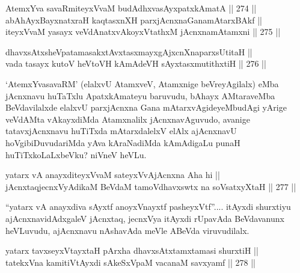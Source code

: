 
\begin{shl}
AtemxYva savaRmiteyxVvaM budAdhxvasAyx\s \s patxkAmatA \hfill || 274 ||  \\
abAhAyxBayxnatxraH kaqtasxnXH parxjAcnxnaGanamAtarxBAkf || \\
iteyxVvaM yasayx veVdAnatxvAkoyxVtathxM jAcnxnamAtamxni \hfill || 275 ||  
\end{shl}

\begin{shl}
dhavxsAtxsheVpatamasakxtAvxtasxmayxgAjxcnXnaparxsUtitaH || \\
vada tasayx kutoV heVtoVH kAmAdeVH sAyxtasxmutithxtiH \hfill || 276 ||  
\end{shl}

\begin{artha}
`AtemxYvasavaRM' (elalxvU AtamxveV, Atamxnige beVreyAgilalx) eMba
jAcnxnavu huTaTxlu ApatxkAmateyu baruvudu, bAhayx AMtaraveMba
BeVdavilalxde elalxvU parxjAcnxna Gana mAtarxvAgideyeMbudAgi yArige
veVdAMta vAkayxdiMda Atamxnalilx jAcnxnavAguvudo, avanige
tatavxjAcnxnavu huTiTxda mAtarxdalelxV elAlx ajAcnxnavU
hoVgibiDuvudariMda yAva kAraNadiMda kAmAdigaLu punaH
huTiTxkoLaLxbeVku? niVneV heVLu.
\end{artha}


\begin{shl}
yatarx vA anayxditeyxVvaM sateyxVvAjAcnxna Aha hi || \\
jAcnxtaqjecnxVyAdikaM BeVdaM tamoVdhavxswtx na soV\s satxyXtaH \hfill || 277 || 
\end{shl}

\begin{artha}
``yatarx vA anayxdiva sAyxtf anoyxV\s nayxtf pasheyxVtf''.... itAyxdi shurxtiyu ajAcnxnavidAdxgaleV jAcnxtaq, jecnxVya
itAyxdi rUpavAda BeVdavanunx heVLuvudu, ajAcnxnavu nAshavAda meVle ABeVda viruvudilalx.
\end{artha}


\begin{shl}
yatarx tavxseyxVtayxtaH pArxha dhavxsAtxtamxtamasi shurxtiH || \\
tatekxVna kamitiVtAyxdi sAkeSxVpaM vacanaM savxyamf \hfill || 278 ||   
\end{shl}

